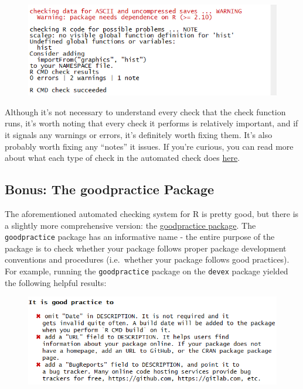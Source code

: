 \documentclass[]{book}
\begin{document}
\begin{figure}
\centering
\includegraphics{images/testSS/autobuildresults.PNG}
\caption{}
\end{figure}

Although it's not necessary to understand every check that the check
function runs, it's worth noting that every check it performs is
relatively important, and if it signals any warnings or errors, it's
definitely worth fixing them. It's also probably worth fixing any
``notes'' it issues. If you're curious, you can read more about what
each type of check in the automated check does
\href{http://r-pkgs.had.co.nz/check.html\#check}{here}.

\subsection{Bonus: The goodpractice
Package}\label{bonus-the-goodpractice-package}

The aforementioned automated checking system for R is pretty good, but
there is a slightly more comprehensive version: the
\href{https://github.com/MangoTheCat/goodpractice/blob/master/vignettes/goodpractice.Rmd}{goodpractice
package}. The \texttt{goodpractice} package has an informative name -
the entire purpose of the package is to check whether your package
follows proper package development conventions and procedures
(i.e.~whether your package follows good practices). For example, running
the \texttt{goodpractice} package on the \texttt{devex} package yielded
the following helpful results:

\begin{figure}
\centering
\includegraphics{images/testSS/goodpractice1.PNG}
\caption{}
\end{figure}
\end{document}
